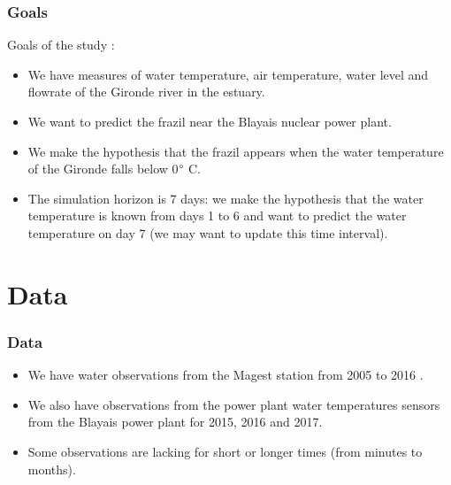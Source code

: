 \documentclass[10pt]{beamer}
\begin{document}

\begin{frame}
\frametitle{Goals}

Goals of the study :
\begin{itemize}
\item We have measures of water temperature, air temperature, 
water level and flowrate of the Gironde river in the estuary.

\item We want to predict the frazil near the Blayais nuclear power plant. 

\item We make the hypothesis that the frazil appears when the water temperature 
of the Gironde falls below 0$\degree$ C.

\item The simulation horizon is 7 days:
we make the hypothesis that the water temperature is known from days 
1 to 6 and want to predict the water temperature on day 7 
(we may want to update this time interval). 
\end{itemize}

\end{frame}


\section{Data}
\begin{frame}
\frametitle{Data}

\begin{itemize}
\item We have water observations from the Magest station from 2005 to 2016 
\cite{Schmidt2014}.
\item We also have observations from the power plant water temperatures sensors 
from the Blayais power plant for 2015, 2016 and 2017.
\item Some observations are lacking for short or longer times (from minutes to 
months). 
\end{itemize}

\end{frame}

\end{document}

